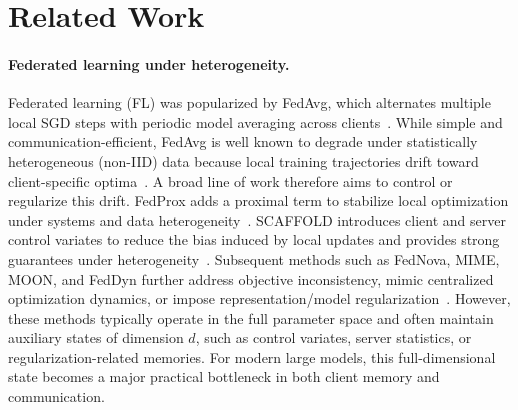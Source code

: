 \section{Related Work}
\label{sec:related-work}

\paragraph{Federated learning under heterogeneity.}
Federated learning (FL) was popularized by FedAvg, which alternates multiple local SGD steps with periodic model averaging across clients~\cite{mcmahan2017communication}. While simple and communication-efficient, FedAvg is well known to degrade under statistically heterogeneous (non-IID) data because local training trajectories drift toward client-specific optima~\cite{hsu2019measuring,karimireddy2020scaffold,sahu2020fedprox,karimireddy2020mime,wang2020fednova,acar2021feddyn,li2021moon}. A broad line of work therefore aims to control or regularize this drift. FedProx adds a proximal term to stabilize local optimization under systems and data heterogeneity~\cite{sahu2020fedprox}. SCAFFOLD introduces client and server control variates to reduce the bias induced by local updates and provides strong guarantees under heterogeneity~\cite{karimireddy2020scaffold}. Subsequent methods such as FedNova, MIME, MOON, and FedDyn further address objective inconsistency, mimic centralized optimization dynamics, or impose representation/model regularization~\cite{wang2020fednova,karimireddy2020mime,li2021moon,acar2021feddyn}. However, these methods typically operate in the full parameter space and often maintain auxiliary states of dimension $d$, such as control variates, server statistics, or regularization-related memories. For modern large models, this full-dimensional state becomes a major practical bottleneck in both client memory and communication.

